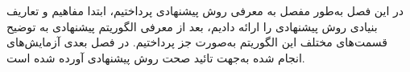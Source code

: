 در این فصل به‌طور مفصل به معرفی روش پیشنهادی پرداختیم، ابتدا مفاهیم و تعاریف بنیادی روش پیشنهادی را ارائه دادیم، بعد از معرفی الگوریتم پیشنهادی به توضیح قسمت‌های مختلف این الگوریتم به‌صورت جز پرداختیم. در فصل بعدی آزمایش‌های انجام شده به‌جهت تائید صحت روش پیشنهادی آورده شده است.